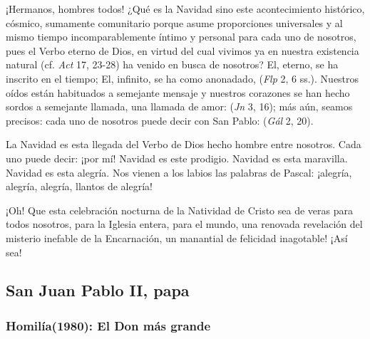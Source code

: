 \begin{body}
	¡Hermanos, hombres todos! ¿Qué es la Navidad sino este acontecimiento histórico, cósmico, sumamente comunitario porque asume proporciones universales y al mismo tiempo incomparablemente íntimo y personal para cada uno de nosotros, pues el Verbo eterno de Dios, en virtud del cual vivimos ya en nuestra existencia natural (cf. \emph{Act} 17, 23-28) ha venido en busca de nosotros? El, eterno, se ha inscrito en el tiempo; El, infinito, se ha como anonadado,  (\emph{Flp} 2, 6 ss.). Nuestros oídos están habituados a semejante mensaje y nuestros corazones se han hecho sordos a semejante llamada, una llamada de amor:  (\emph{Jn} 3, 16); más aún, seamos precisos: cada uno de nosotros puede decir con San Pablo:  (\emph{Gál} 2, 20).
	
	La Navidad es esta llegada del Verbo de Dios hecho hombre entre nosotros. Cada uno puede decir: ¡por mí! Navidad es este prodigio. Navidad es esta maravilla. Navidad es esta alegría. Nos vienen a los labios las palabras de Pascal: ¡alegría, alegría, alegría, llantos de alegría!
	
	¡Oh! Que esta celebración nocturna de la Natividad de Cristo sea de veras para todos nosotros, para la Iglesia entera, para el mundo, una renovada revelación del misterio inefable de la Encarnación, un manantial de felicidad inagotable! ¡Así sea!
\end{body}

\newsection		


\subsection{San Juan Pablo II, papa}

\subsubsection{Homilía(1980): El Don más grande}




